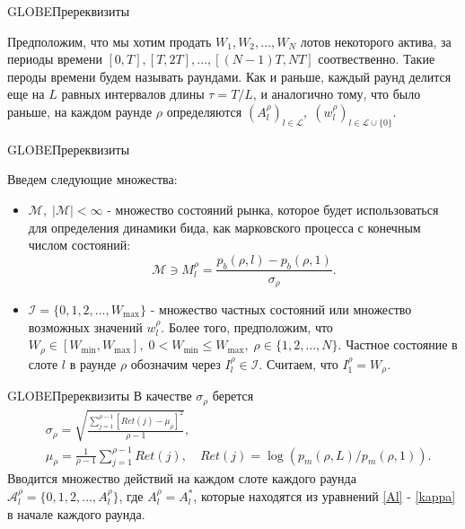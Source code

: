 \documentclass[aspectratio=169]{beamer}
\begin{document}
        \begin{frame}{GLOBE}{Пререквизиты}

            Предположим, что мы хотим продать $W_1, W_2, \ldots, W_N$ лотов некоторого актива, за периоды времени $[0, T], [T, 2T], \ldots, [(N-1)T, NT]$ соотвественно. Такие пероды времени будем называть раундами.
            Как и раньше, каждый раунд делится еще на $L$ равных интервалов длины $\tau = T/L$, и аналогично тому, что было раньше, на каждом раунде $\rho$ определяются $(A_l^\rho)_{l \in \mathcal L}, \; (w_l^\rho)_{l \in \mathcal L \cup \{0\}}$.

        \end{frame}

        \begin{frame}{GLOBE}{Пререквизиты}

            Введем следующие множества:
        
            \begin{itemize}
                \item $\mathcal M , \; |\mathcal M| < \infty$ - множество состояний рынка, которое будет использоваться для определения динамики бида, как марковского процесса с конечным числом состояний:
                \begin{equation*}
                    \mathcal M \ni M_l^\rho = \frac {p_b(\rho, l) - p_b(\rho, 1)}{\sigma_\rho}.
                \end{equation*}
                
                \item $\mathcal I = \{0,1, 2, \ldots, W_{\max} \}$ - множество частных состояний или множество возможных значений $w_l^\rho$. Более того, предположим, что $W_\rho \in [W_{\min}, W_{\max}], \; 0<W_{\min} \leqslant W_{\max}, \; \rho \in \{1, 2, \ldots, N \}$. Частное состояние в слоте $l$ в раунде $\rho$ обозначим через $I_l^\rho \in \mathcal I$. Считаем, что $I_1^\rho = W_\rho$.
            \end{itemize}
        
        \end{frame}

        \begin{frame}{GLOBE}{Пререквизиты}
            В качестве $\sigma_\rho$ берется
            \begin{align*}
                &\sigma_\rho = \sqrt{\frac {\sum\limits_{j=1}^{\rho -1}[Ret(j) - \mu_\rho ]^2} {\rho - 1} },\\
                &\mu_\rho =  \frac1{\rho -1}\sum_{j=1}^{\rho -1} Ret(j) , \quad Ret(j) =  \log(p_m(\rho, L)/p_m(\rho, 1) ).
            \end{align*}
            Вводится множество действий на каждом слоте каждого раунда $\mathcal A_l^\rho = \{0,1,2,\ldots, A_l^\rho \}$, где $A_l^\rho = A_l^{*}$, которые находятся из уравнений \eqref{Al} - \eqref{kappa} в начале каждого раунда. 
        \end{frame}
\end{document}
